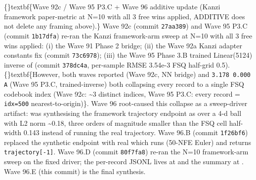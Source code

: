 \documentclass{article}
\begin{document}
\sloppy \{\}textbf\{Wave 92c / Wave 95 P3.C + Wave 96 additive update (Kanzi framework paper-metric at N=10 with all 3 free wins applied, ADDITIVE  does not delete any framing above).\} Wave 92c (commit \texttt{27aa389}) and Wave 95 P3.C (commit \texttt{1b17dfa}) re-ran the Kanzi framework-arm sweep at N=10 with all 3 free wins applied: (i) the Wave 91 Phase 2  bridge; (ii) the Wave 92a Kanzi adapter constants fix (commit \texttt{73c6978}); (iii) the Wave 95 Phase 3.B trained Linear(5124) inverse of  (commit \texttt{378dc4a}, per-sample RMSE 3.54e-3  FSQ half-grid 0.5). \{\}textbf\{However, both waves reported  (Wave 92c, NN bridge) and \texttt{3.178  0.000 A} (Wave 95 P3.C, trained-inverse)  both collapsing every record to a single FSQ codebook index (Wave 92c: \textasciitilde{}3 distinct indices, Wave 95 P3.C: every record = \texttt{idx=500} nearest-to-origin)\}. Wave 96 root-caused this collapse as a sweep-driver artifact:  was synthesising the framework trajectory endpoint as  over   a 4-d ball with L2 norm \textasciitilde{}0.18, three orders of magnitude smaller than the FSQ cell half-width 0.143  instead of running the real  trajectory. Wave 96.B (commit \texttt{1f26bf6}) replaced the synthetic endpoint with real  which runs  (50-NFE Euler) and returns \texttt{trajectory[-1]}. Wave 96.D (commit \texttt{80f7fa8}) re-ran the N=10 framework-arm sweep on the fixed driver; the per-record JSONL lives at  and the summary at . Wave 96.E (this commit) is the final synthesis.
\end{document}
